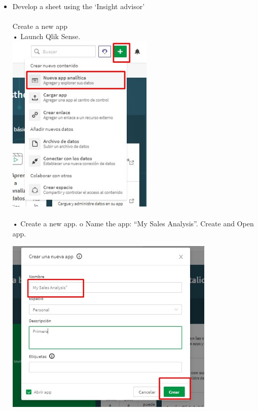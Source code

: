 \documentclass[preprint,12pt]{elsarticle}
\begin{document}
	\begin{itemize}
			\item Develop a sheet using the ‘Insight advisor’ \\
		 		
		 		
		 		\\Create a new app
		 		\\• Launch Qlik Sense. \\
		 			\includegraphics[width=7cm]{./IMAGENES/1.1} \\
		 		\\• Create a new app.
		 			o Name the app: “My Sales Analysis”.
		 			Create and Open app.
		 		
		 		 \includegraphics[width=10cm]{./IMAGENES/1.2}  \\
		 		 

\end{itemize}
\end{document}
